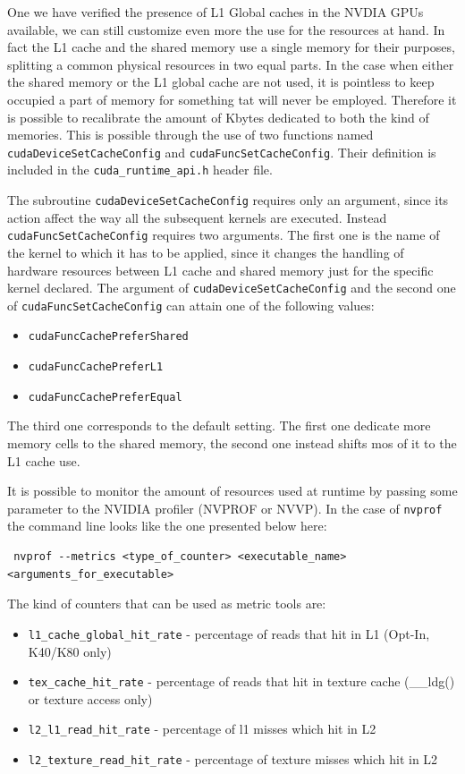 \documentclass[a4paper,10pt]{article}
\begin{document}
One we have verified the presence of L1 Global caches in the NVDIA GPUs 
available, we can still customize even more the use for the resources at hand. 
In fact the L1 cache and the shared memory use a single memory for 
their purposes, splitting a common physical resources in two equal parts. In 
the case when either the shared memory or the L1 global cache are not used, it 
is pointless to keep occupied a part of memory for something tat will never be 
employed. Therefore it is possible to recalibrate the amount of Kbytes 
dedicated to both the kind of memories. 
This is possible through the use of two functions named 
\texttt{cudaDeviceSetCacheConfig} and \texttt{cudaFuncSetCacheConfig}. Their 
definition is included in the \texttt{cuda\_runtime\_api.h} header file.

The subroutine \texttt{cudaDeviceSetCacheConfig} requires only an argument, 
since its action affect the way all the subsequent kernels are executed. 
Instead \texttt{cudaFuncSetCacheConfig} requires two arguments. The first one 
is the name of the kernel to which it has to be applied, since it changes the 
handling of hardware resources between L1 cache and shared memory just for the 
specific kernel declared. 
The argument of \texttt{cudaDeviceSetCacheConfig} and the second one of 
\texttt{cudaFuncSetCacheConfig} can attain one of the following values:

\begin{itemize}
 \item \texttt{cudaFuncCachePreferShared}
 \item \texttt{cudaFuncCachePreferL1}
 \item \texttt{cudaFuncCachePreferEqual}
\end{itemize}

The third one corresponds to the default setting. The first one dedicate more 
memory cells to the shared memory, the second one instead shifts mos of it to 
the L1 cache use.\newline

It is possible to monitor the amount of resources used at runtime by passing 
some parameter to the NVIDIA profiler (NVPROF or NVVP). 
In the case of \texttt{nvprof} the command line looks like the one presented 
below here:
\hspace*{-2cm}
\begin{lstlisting}
 nvprof --metrics <type_of_counter> <executable_name> 
<arguments_for_executable>
\end{lstlisting}

The kind of counters that can be used as metric tools are:
\begin{itemize}
 \item \texttt{l1\_cache\_global\_hit\_rate} - percentage of reads that hit in 
L1 (Opt-In, K40/K80 only)
\item \texttt{tex\_cache\_hit\_rate} - percentage of reads that hit in texture 
cache (\_\_ldg() or texture access only) 
\item \texttt{l2\_l1\_read\_hit\_rate} - percentage of l1 misses which hit in L2
\item \texttt{l2\_texture\_read\_hit\_rate} - percentage of texture misses 
which hit in L2
\end{itemize}
\end{document}
